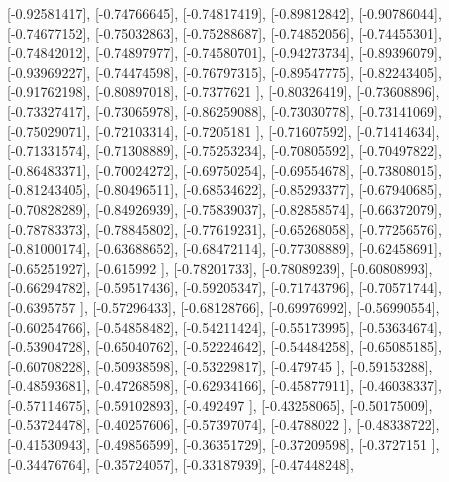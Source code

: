 \documentclass{article}
\begin{document}
       [-0.92581417],
       [-0.74766645],
       [-0.74817419],
       [-0.89812842],
       [-0.90786044],
       [-0.74677152],
       [-0.75032863],
       [-0.75288687],
       [-0.74852056],
       [-0.74455301],
       [-0.74842012],
       [-0.74897977],
       [-0.74580701],
       [-0.94273734],
       [-0.89396079],
       [-0.93969227],
       [-0.74474598],
       [-0.76797315],
       [-0.89547775],
       [-0.82243405],
       [-0.91762198],
       [-0.80897018],
       [-0.7377621 ],
       [-0.80326419],
       [-0.73608896],
       [-0.73327417],
       [-0.73065978],
       [-0.86259088],
       [-0.73030778],
       [-0.73141069],
       [-0.75029071],
       [-0.72103314],
       [-0.7205181 ],
       [-0.71607592],
       [-0.71414634],
       [-0.71331574],
       [-0.71308889],
       [-0.75253234],
       [-0.70805592],
       [-0.70497822],
       [-0.86483371],
       [-0.70024272],
       [-0.69750254],
       [-0.69554678],
       [-0.73808015],
       [-0.81243405],
       [-0.80496511],
       [-0.68534622],
       [-0.85293377],
       [-0.67940685],
       [-0.70828289],
       [-0.84926939],
       [-0.75839037],
       [-0.82858574],
       [-0.66372079],
       [-0.78783373],
       [-0.78845802],
       [-0.77619231],
       [-0.65268058],
       [-0.77256576],
       [-0.81000174],
       [-0.63688652],
       [-0.68472114],
       [-0.77308889],
       [-0.62458691],
       [-0.65251927],
       [-0.615992  ],
       [-0.78201733],
       [-0.78089239],
       [-0.60808993],
       [-0.66294782],
       [-0.59517436],
       [-0.59205347],
       [-0.71743796],
       [-0.70571744],
       [-0.6395757 ],
       [-0.57296433],
       [-0.68128766],
       [-0.69976992],
       [-0.56990554],
       [-0.60254766],
       [-0.54858482],
       [-0.54211424],
       [-0.55173995],
       [-0.53634674],
       [-0.53904728],
       [-0.65040762],
       [-0.52224642],
       [-0.54484258],
       [-0.65085185],
       [-0.60708228],
       [-0.50938598],
       [-0.53229817],
       [-0.479745  ],
       [-0.59153288],
       [-0.48593681],
       [-0.47268598],
       [-0.62934166],
       [-0.45877911],
       [-0.46038337],
       [-0.57114675],
       [-0.59102893],
       [-0.492497  ],
       [-0.43258065],
       [-0.50175009],
       [-0.53724478],
       [-0.40257606],
       [-0.57397074],
       [-0.4788022 ],
       [-0.48338722],
       [-0.41530943],
       [-0.49856599],
       [-0.36351729],
       [-0.37209598],
       [-0.3727151 ],
       [-0.34476764],
       [-0.35724057],
       [-0.33187939],
       [-0.47448248],
\end{document}
